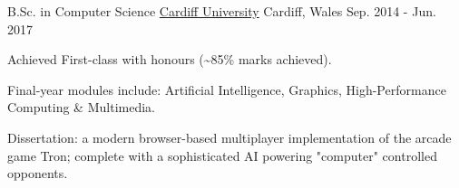 \pagebreak


\begin{cventries}

  \cventry
    {B.Sc. in Computer Science} %
    {\href{https://www.cardiff.ac.uk/}{Cardiff University}} %
    {Cardiff, Wales} %
    {Sep. 2014 - Jun. 2017} %
    {
      \begin{cvitems} %
        \item Achieved First-class with honours (\textasciitilde{}85\% marks achieved).
        \item Final-year modules include: Artificial Intelligence, Graphics, High-Performance Computing \& Multimedia.
        \item Dissertation: a modern browser-based multiplayer implementation of the arcade game Tron; complete with a sophisticated AI powering "computer" controlled opponents.
      \end{cvitems}
    }
    {}


\end{cventries}
